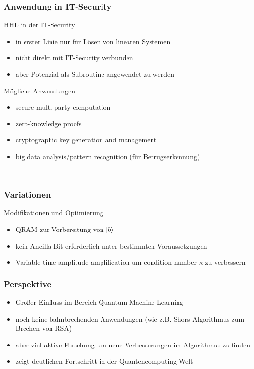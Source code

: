\begin{frame}
    \frametitle{Anwendung in IT-Security}

    HHL in der IT-Security
    \begin{itemize}
        \item in erster Linie nur für Lösen von linearen Systemen
        \item nicht direkt mit IT-Security verbunden
        \item aber Potenzial als Subroutine angewendet zu werden
    \end{itemize}

    \hfil

    Mögliche Anwendungen
     \begin{itemize}
        \item secure multi-party computation 
        \item zero-knowledge proofs
        \item cryptographic key generation and management
        \item big data analysis/pattern recognition (für Betrugserkennung)

    \end{itemize}
\   
\end{frame}

\begin{frame}
    \frametitle{Variationen}

    Modifikationen und Optimierung
    \begin{itemize}
        \item QRAM zur Vorbereitung von $\ket{b}$
        \item kein Ancilla-Bit erforderlich unter bestimmten Voraussetzungen 
        \item Variable time amplitude amplification um condition number $\kappa$ zu verbessern
    \end{itemize}
    
\end{frame}

\begin{frame}
    \frametitle{Perspektive}

    \begin{itemize}
        \item  Großer Einfluss im Bereich Quantum Machine Learning 
        \item  noch keine bahnbrechenden Anwendungen (wie z.B. Shors Algorithmus zum Brechen von RSA)
        \item  aber viel aktive Forschung um neue Verbesserungen im Algorithmus zu finden
        \item  zeigt deutlichen Fortschritt in der Quantencomputing Welt
    \end{itemize}
    
\end{frame}

